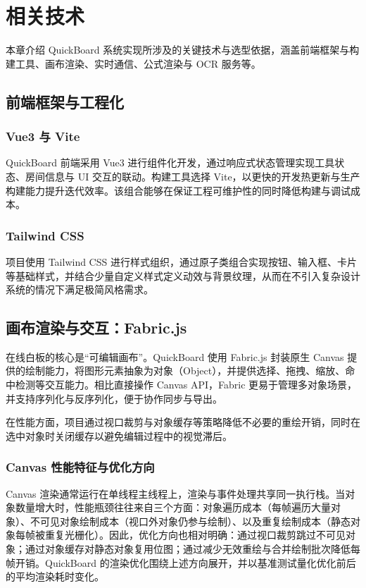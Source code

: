 \chapter{相关技术}\label{chap:tech}

本章介绍 QuickBoard 系统实现所涉及的关键技术与选型依据，涵盖前端框架与构建工具、画布渲染、实时通信、公式渲染与 OCR 服务等。

\section{前端框架与工程化}
\subsection{Vue3 与 Vite}
QuickBoard 前端采用 Vue3 进行组件化开发，通过响应式状态管理实现工具状态、房间信息与 UI 交互的联动。构建工具选择 Vite，以更快的开发热更新与生产构建能力提升迭代效率。该组合能够在保证工程可维护性的同时降低构建与调试成本。\cite{vue3,vite}

\subsection{Tailwind CSS}
项目使用 Tailwind CSS 进行样式组织，通过原子类组合实现按钮、输入框、卡片等基础样式，并结合少量自定义样式定义动效与背景纹理，从而在不引入复杂设计系统的情况下满足极简风格需求。

\section{画布渲染与交互：Fabric.js}
在线白板的核心是“可编辑画布”。QuickBoard 使用 Fabric.js 封装原生 Canvas 提供的绘制能力，将图形元素抽象为对象（Object），并提供选择、拖拽、缩放、命中检测等交互能力。相比直接操作 Canvas API，Fabric 更易于管理多对象场景，并支持序列化与反序列化，便于协作同步与导出。

在性能方面，项目通过视口裁剪与对象缓存等策略降低不必要的重绘开销，同时在选中对象时关闭缓存以避免编辑过程中的视觉滞后。\cite{fabricjs}

\subsection{Canvas 性能特征与优化方向}
Canvas 渲染通常运行在单线程主线程上，渲染与事件处理共享同一执行栈。当对象数量增大时，性能瓶颈往往来自三个方面：对象遍历成本（每帧遍历大量对象）、不可见对象绘制成本（视口外对象仍参与绘制）、以及重复绘制成本（静态对象每帧被重复光栅化）。因此，优化方向也相对明确：通过视口裁剪跳过不可见对象；通过对象缓存对静态对象复用位图；通过减少无效重绘与合并绘制批次降低每帧开销。QuickBoard 的渲染优化围绕上述方向展开，并以基准测试量化优化前后的平均渲染耗时变化。

